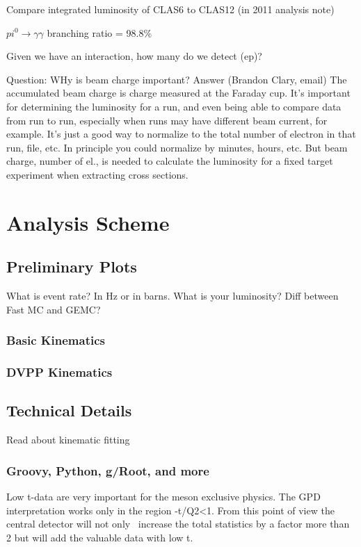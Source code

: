     Compare integrated luminosity of CLAS6 to CLAS12 (in 2011 analysis note)
    
    $pi^0 \longrightarrow \gamma \gamma$ branching ratio = 98.8\%
    
    Given we have an interaction, how many do we detect (ep)?
    
    Question: WHy is beam charge important?
    Answer (Brandon Clary, email) The accumulated beam charge is charge measured at the Faraday cup. It's important for determining the luminosity for a run, and even being able to compare data from run to run, especially when runs may have different beam current, for example. It's just a good way to normalize to the total number of electron in that run, file, etc. In principle you could normalize by minutes, hours, etc. But beam charge, number of el., is needed to calculate the luminosity for a fixed target experiment when extracting cross sections.
\chapter{Analysis Scheme}
    \section{Preliminary Plots}
    What is event rate? In Hz or in barns. What is your luminosity?
    Diff between Fast MC and GEMC?
        \subsection{Basic Kinematics}
        \subsection{DVPP Kinematics}

    \section{Technical Details}
        Read about kinematic fitting
            \subsection{Groovy, Python, g/Root, and more}
            
            
            


Low t-data are very important for the meson exclusive physics. The GPD interpretation works only in the region -t/Q2<1. From this point of view the central detector will not only  increase the total statistics by a factor more than 2 but will add the valuable data with low t.


